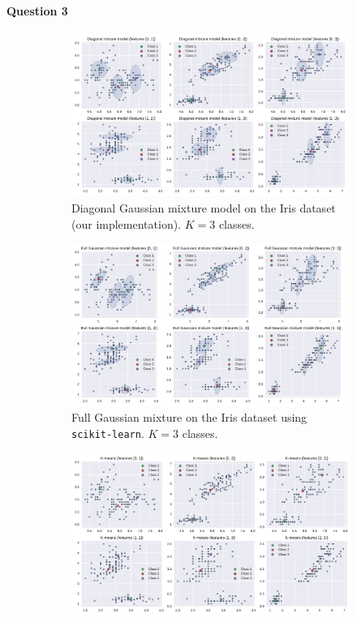 \documentclass[11pt]{article}
\begin{document}
\paragraph{Question 3}
\begin{figure}
	\centering
	\begin{subfigure}[t]{.8\linewidth}
		\includegraphics[width=\linewidth]{images/diag_em_K3.pdf}
		\caption{Diagonal Gaussian mixture model on the Iris dataset (our implementation). $K=3$ classes.}
	\end{subfigure}
	\begin{subfigure}[t]{.8\linewidth}
		\includegraphics[width=\linewidth]{images/full_em_K3.pdf}
		\caption{Full Gaussian mixture on the Iris dataset using \texttt{scikit-learn}. $K=3$ classes.}
	\end{subfigure}
	\begin{subfigure}[t]{.8\linewidth}
		\includegraphics[width=\linewidth]{images/kmeans_K3.pdf}

\end{subfigure}
\end{figure}
\end{document}
